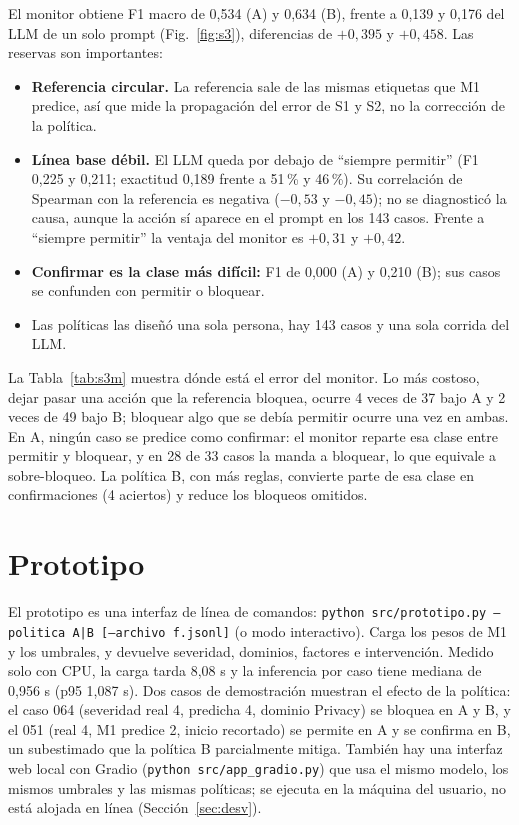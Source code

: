 \documentclass[conference]{IEEEtran}
\begin{document}
El monitor obtiene F1 macro de 0,534 (A) y 0,634 (B), frente a 0,139 y 0,176 del LLM de un solo prompt (Fig.~\ref{fig:s3}), diferencias de $+0{,}395$ y $+0{,}458$. Las reservas son importantes:
\begin{itemize}
\item \textbf{Referencia circular.} La referencia sale de las mismas etiquetas que M1 predice, así que mide la propagación del error de S1 y S2, no la corrección de la política.
\item \textbf{Línea base débil.} El LLM queda por debajo de ``siempre permitir'' (F1 0,225 y 0,211; exactitud 0,189 frente a 51\,\% y 46\,\%). Su correlación de Spearman con la referencia es negativa ($-0{,}53$ y $-0{,}45$); no se diagnosticó la causa, aunque la acción sí aparece en el prompt en los 143 casos. Frente a ``siempre permitir'' la ventaja del monitor es $+0{,}31$ y $+0{,}42$.
\item \textbf{Confirmar es la clase más difícil:} F1 de 0,000 (A) y 0,210 (B); sus casos se confunden con permitir o bloquear.
\item Las políticas las diseñó una sola persona, hay 143 casos y una sola corrida del LLM.
\end{itemize}
La Tabla~\ref{tab:s3m} muestra dónde está el error del monitor. Lo más costoso, dejar pasar una acción que la referencia bloquea, ocurre 4 veces de 37 bajo A y 2 veces de 49 bajo B; bloquear algo que se debía permitir ocurre una vez en ambas. En A, ningún caso se predice como confirmar: el monitor reparte esa clase entre permitir y bloquear, y en 28 de 33 casos la manda a bloquear, lo que equivale a sobre-bloqueo. La política B, con más reglas, convierte parte de esa clase en confirmaciones (4 aciertos) y reduce los bloqueos omitidos.

\section{Prototipo}
El prototipo es una interfaz de línea de comandos: \texttt{python src/prototipo.py --politica A|B [--archivo f.jsonl]} (o modo interactivo). Carga los pesos de M1 y los umbrales, y devuelve severidad, dominios, factores e intervención. Medido solo con CPU, la carga tarda 8,08 s y la inferencia por caso tiene mediana de 0,956 s (p95 1,087 s). Dos casos de demostración muestran el efecto de la política: el caso 064 (severidad real 4, predicha 4, dominio Privacy) se bloquea en A y B, y el 051 (real 4, M1 predice 2, inicio recortado) se permite en A y se confirma en B, un subestimado que la política B parcialmente mitiga. También hay una interfaz web local con Gradio (\texttt{python src/app\_gradio.py}) que usa el mismo modelo, los mismos umbrales y las mismas políticas; se ejecuta en la máquina del usuario, no está alojada en línea (Sección~\ref{sec:desv}).
\end{document}
